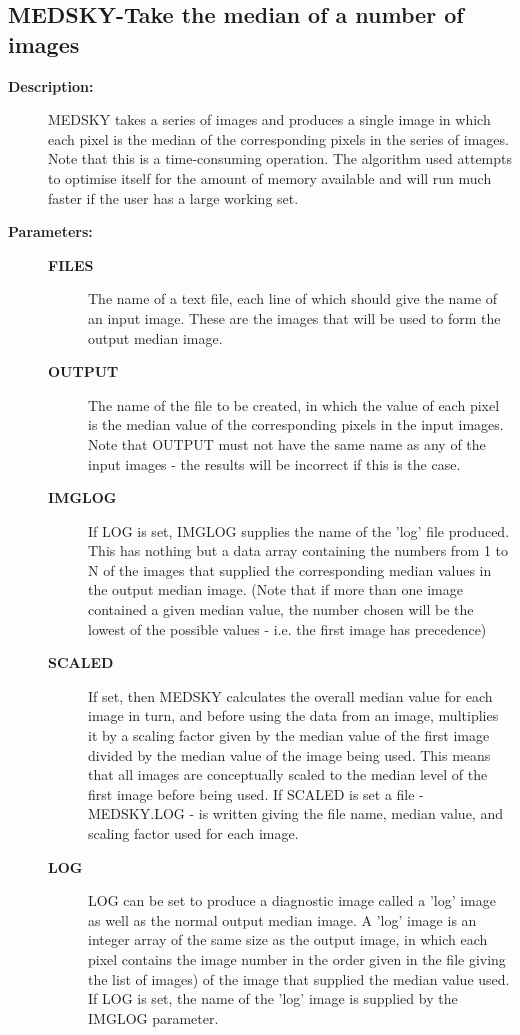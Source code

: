 \subsection{MEDSKY-\label{MEDSKY}Take the median of a number of images}
\begin{description}

\item [{\bf Description:}]
 MEDSKY takes a series of images and produces a single image in
 which each pixel is the median of the corresponding pixels in the
 series of images.   Note that this is a time-consuming operation.
 The algorithm used attempts to optimise itself for the amount of
 memory available and will run much faster if the user has a large
 working set.

\item [{\bf Parameters:}]
\begin{description}
\item [{\bf FILES}]
 The name of a text file, each line of which
 should give the name of an input image.  These are the
 images that will be used to form the output median image.
\item [{\bf OUTPUT}]
 The name of the file to be created, in
 which the value of each pixel is the median value of the
 corresponding pixels in the input images.  Note that
 OUTPUT must not have the same name as any of the input
 images - the results will be incorrect if this is the
 case.
\item [{\bf IMGLOG}]
 If LOG is set, IMGLOG supplies the name of the 'log'
 file produced.  This has nothing but a data array
 containing the numbers from 1 to N of the images that
 supplied the corresponding median values in the output
 median image.  (Note that if more than one image contained
 a given median value, the number chosen will be the lowest
 of the possible values - i.e. the first image has precedence)
\item [{\bf SCALED}]
 If set, then MEDSKY calculates the overall median value
 for each image in turn, and before using the data from
 an image, multiplies it by a scaling factor given by the
 median value of the first image divided by the median value
 of the image being used.  This means that all images are
 conceptually scaled to the median level of the first image
 before being used.  If SCALED is set a file - MEDSKY.LOG -
 is written giving the file name, median value, and scaling
 factor used for each image.
\item [{\bf LOG}]
 LOG can be set to produce a diagnostic image called
 a 'log' image as well as the normal output median image.
 A 'log' image is an integer array of the same size as the
 output image, in which each pixel contains the image number
 in the order given in the file giving the list of images)
 of the image that supplied the median value used. If LOG
 is set, the name of the 'log' image is supplied by the
 IMGLOG parameter.
\end{description}


\end{description}
